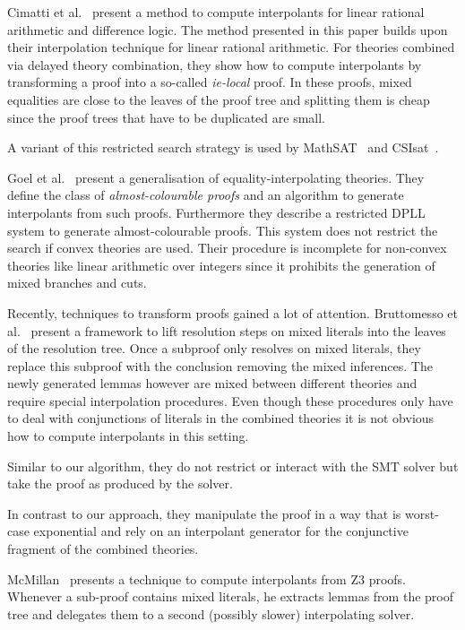 Cimatti et al.~\cite{Cimatti2010} present a method to compute interpolants for
linear rational arithmetic and difference logic. The method presented in this paper builds upon
their interpolation technique for linear rational arithmetic. For theories combined via delayed
theory combination, they show how to compute interpolants by
transforming a proof into a so-called \emph{ie-local} proof.  In these proofs,
mixed equalities are close to the leaves of the proof tree and
splitting them is cheap since the proof trees that have to be
duplicated are small. 
\begin{techreport}
A variant of this restricted search strategy is used by
MathSAT~\cite{Griggio2012} and CSIsat~\cite{DBLP:conf/cav/BeyerZM08}.
\end{techreport}

Goel et al.~\cite{Goel2009} present a generalisation of
equality-interpolating theories. They define the class of
\emph{almost-colourable proofs} and an algorithm to generate interpolants from
such proofs. Furthermore they describe a restricted DPLL system to generate
almost-colourable proofs. This system does not restrict the search if convex
theories are used. Their procedure is incomplete for non-convex theories like
linear arithmetic over integers since it prohibits the generation of mixed 
branches and cuts.

Recently, techniques to transform proofs gained a lot of
attention. Bruttomesso et al.~\cite{Bruttomesso2010} present a framework to
lift resolution steps on mixed literals into the leaves of the resolution
tree. Once a subproof only resolves on mixed literals, they replace this
subproof with the conclusion removing the mixed inferences. 
The newly generated lemmas however are mixed between different theories and require
special interpolation procedures. Even though these procedures only have to
deal with conjunctions of literals in the combined theories it is not obvious
how to compute interpolants in this setting. 
\begin{techreport}
Similar to our algorithm, they do
not restrict or interact with the SMT solver but take the proof as produced by
the solver. 
\end{techreport}
In contrast to our approach, they manipulate the proof in a way
that is worst-case exponential and rely on an interpolant generator for the
conjunctive fragment of the combined theories.

McMillan~\cite{McMillan12iZ3} presents a technique
to compute interpolants from Z3 proofs. 
Whenever a sub-proof contains mixed
literals, he 
extracts lemmas from the proof tree and delegates them to a second
(possibly slower) interpolating solver.

